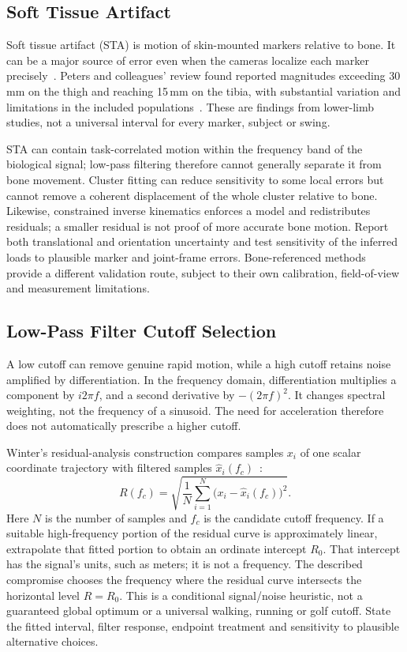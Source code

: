 \subsection{Soft Tissue Artifact}
\label{sec:sta}

Soft tissue artifact (STA) is motion of skin-mounted markers relative to bone.
It can be a major source of error even when the cameras localize each marker precisely~\cite{leardini2005human}.
Peters and colleagues' review found reported magnitudes exceeding 30\,mm on the thigh and reaching 15\,mm on the tibia, with substantial variation and limitations in the included populations~\cite{peters2010quantification}.
These are findings from lower-limb studies, not a universal interval for every marker, subject or swing.

STA can contain task-correlated motion within the frequency band of the biological signal; low-pass filtering therefore cannot generally separate it from bone movement.
Cluster fitting can reduce sensitivity to some local errors but cannot remove a coherent displacement of the whole cluster relative to bone.
Likewise, constrained inverse kinematics enforces a model and redistributes residuals; a smaller residual is not proof of more accurate bone motion.
Report both translational and orientation uncertainty and test sensitivity of the inferred loads to plausible marker and joint-frame errors.
Bone-referenced methods provide a different validation route, subject to their own calibration, field-of-view and measurement limitations.

\subsection{Low-Pass Filter Cutoff Selection}
\label{sec:filter-cutoff}

A low cutoff can remove genuine rapid motion, while a high cutoff retains noise amplified by differentiation.
In the frequency domain, differentiation multiplies a component by $i2\pi f$, and a second derivative by $-(2\pi f)^2$.
It changes spectral weighting, not the frequency of a sinusoid.
The need for acceleration therefore does not automatically prescribe a higher cutoff.

Winter's residual-analysis construction compares samples $x_i$ of one scalar coordinate trajectory with filtered samples $\hat{x}_i(f_c)$~\cite[Section 3.4.4.3]{Winter2009}:
\[
R(f_c)=\sqrt{\frac{1}{N}\sum_{i=1}^{N}
\bigl(x_i-\hat{x}_i(f_c)\bigr)^2}.
\]
Here $N$ is the number of samples and $f_c$ is the candidate cutoff frequency.
If a suitable high-frequency portion of the residual curve is approximately linear, extrapolate that fitted portion to obtain an ordinate intercept $R_0$.
That intercept has the signal's units, such as meters; it is not a frequency.
The described compromise chooses the frequency where the residual curve intersects the horizontal level $R=R_0$.
This is a conditional signal/noise heuristic, not a guaranteed global optimum or a universal walking, running or golf cutoff.
State the fitted interval, filter response, endpoint treatment and sensitivity to plausible alternative choices.

